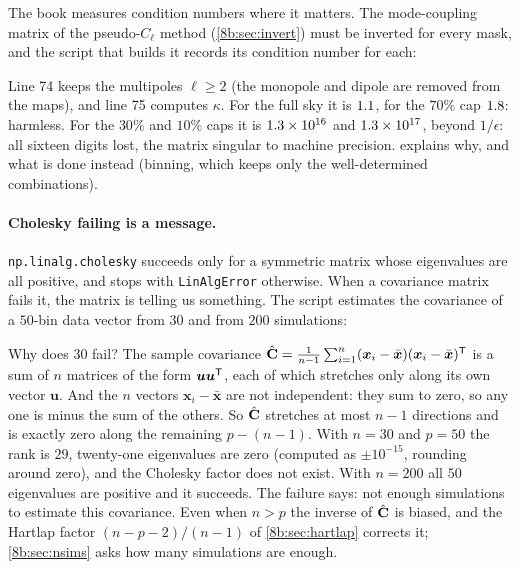 The book measures condition numbers where it matters. The mode-coupling matrix of the pseudo-$C_\ell$ method (\cref{8b:sec:invert}) must be inverted for every mask, and the script that builds it records its condition number for each:


Line 74 keeps the multipoles $\ell\ge2$ (the monopole and dipole are removed from the maps), and line 75 computes $\kappa$. For the full sky it is $1.1$, for the $70\%$ cap $1.8$: harmless. For the $30\%$ and $10\%$ caps it is $1.3\times10^{16}$ and $1.3\times10^{17}$, beyond $1/\epsilon$: all sixteen digits lost, the matrix singular to machine precision.  explains why, and what is done instead (binning, which keeps only the well-determined combinations).

\paragraph{Cholesky failing is a message.} \texttt{np.linalg.cholesky} succeeds only for a symmetric matrix whose eigenvalues are all positive, and stops with \texttt{LinAlgError} otherwise. When a covariance matrix fails it, the matrix is telling us something. The script estimates the covariance of a $50$-bin data vector from $30$ and from $200$ simulations:


Why does $30$ fail? The sample covariance $\hat{\mathbf{C}}=\frac1{n-1}\sum_{i=1}^n(\bm x_i-\bar{\bm x})(\bm x_i-\bar{\bm x})^{\mathsf{T}}$ is a sum of $n$ matrices of the form $\bm u\bm u^{\mathsf{T}}$, each of which stretches only along its own vector $\bm u$. And the $n$ vectors $\bm x_i-\bar{\bm x}$ are not independent: they sum to zero, so any one is minus the sum of the others. So $\hat{\mathbf{C}}$ stretches at most $n-1$ directions and is exactly zero along the remaining $p-(n-1)$. With $n=30$ and $p=50$ the rank is $29$, twenty-one eigenvalues are zero (computed as $\pm10^{-15}$, rounding around zero), and the Cholesky factor does not exist. With $n=200$ all $50$ eigenvalues are positive and it succeeds. The failure says: not enough simulations to estimate this covariance. Even when $n>p$ the inverse of $\hat{\mathbf{C}}$ is biased, and the Hartlap factor $(n-p-2)/(n-1)$ of \cref{8b:sec:hartlap} corrects it; \cref{8b:sec:nsims} asks how many simulations are enough.


